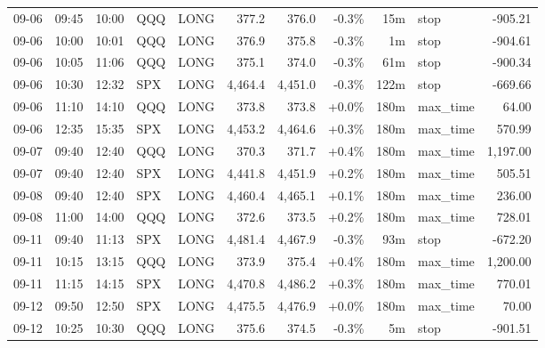 \documentclass[11pt,a4paper,twoside]{article}
\begin{document}
\begin{center}
\begin{longtable}{>{\color{txtmain}}l l l l l r r r r >{\color{txtmain}}l r}
09-06 & 09:45 & 10:00 & QQQ & LONG & 377.2 & 376.0 & \textcolor{lossred}{-0.3\%} & 15m & stop & \textcolor{lossred}{-905.21} \\
09-06 & 10:00 & 10:01 & QQQ & LONG & 376.9 & 375.8 & \textcolor{lossred}{-0.3\%} & 1m & stop & \textcolor{lossred}{-904.61} \\
09-06 & 10:05 & 11:06 & QQQ & LONG & 375.1 & 374.0 & \textcolor{lossred}{-0.3\%} & 61m & stop & \textcolor{lossred}{-900.34} \\
09-06 & 10:30 & 12:32 & SPX & LONG & 4,464.4 & 4,451.0 & \textcolor{lossred}{-0.3\%} & 122m & stop & \textcolor{lossred}{-669.66} \\
09-06 & 11:10 & 14:10 & QQQ & LONG & 373.8 & 373.8 & \textcolor{wingreen}{+0.0\%} & 180m & max\_time & \textcolor{wingreen}{64.00} \\
09-06 & 12:35 & 15:35 & SPX & LONG & 4,453.2 & 4,464.6 & \textcolor{wingreen}{+0.3\%} & 180m & max\_time & \textcolor{wingreen}{570.99} \\
09-07 & 09:40 & 12:40 & QQQ & LONG & 370.3 & 371.7 & \textcolor{wingreen}{+0.4\%} & 180m & max\_time & \textcolor{wingreen}{1,197.00} \\
09-07 & 09:40 & 12:40 & SPX & LONG & 4,441.8 & 4,451.9 & \textcolor{wingreen}{+0.2\%} & 180m & max\_time & \textcolor{wingreen}{505.51} \\
09-08 & 09:40 & 12:40 & SPX & LONG & 4,460.4 & 4,465.1 & \textcolor{wingreen}{+0.1\%} & 180m & max\_time & \textcolor{wingreen}{236.00} \\
09-08 & 11:00 & 14:00 & QQQ & LONG & 372.6 & 373.5 & \textcolor{wingreen}{+0.2\%} & 180m & max\_time & \textcolor{wingreen}{728.01} \\
09-11 & 09:40 & 11:13 & SPX & LONG & 4,481.4 & 4,467.9 & \textcolor{lossred}{-0.3\%} & 93m & stop & \textcolor{lossred}{-672.20} \\
09-11 & 10:15 & 13:15 & QQQ & LONG & 373.9 & 375.4 & \textcolor{wingreen}{+0.4\%} & 180m & max\_time & \textcolor{wingreen}{1,200.00} \\
09-11 & 11:15 & 14:15 & SPX & LONG & 4,470.8 & 4,486.2 & \textcolor{wingreen}{+0.3\%} & 180m & max\_time & \textcolor{wingreen}{770.01} \\
09-12 & 09:50 & 12:50 & SPX & LONG & 4,475.5 & 4,476.9 & \textcolor{wingreen}{+0.0\%} & 180m & max\_time & \textcolor{wingreen}{70.00} \\
09-12 & 10:25 & 10:30 & QQQ & LONG & 375.6 & 374.5 & \textcolor{lossred}{-0.3\%} & 5m & stop & \textcolor{lossred}{-901.51} \\

\end{longtable}
\end{center}
\end{document}
